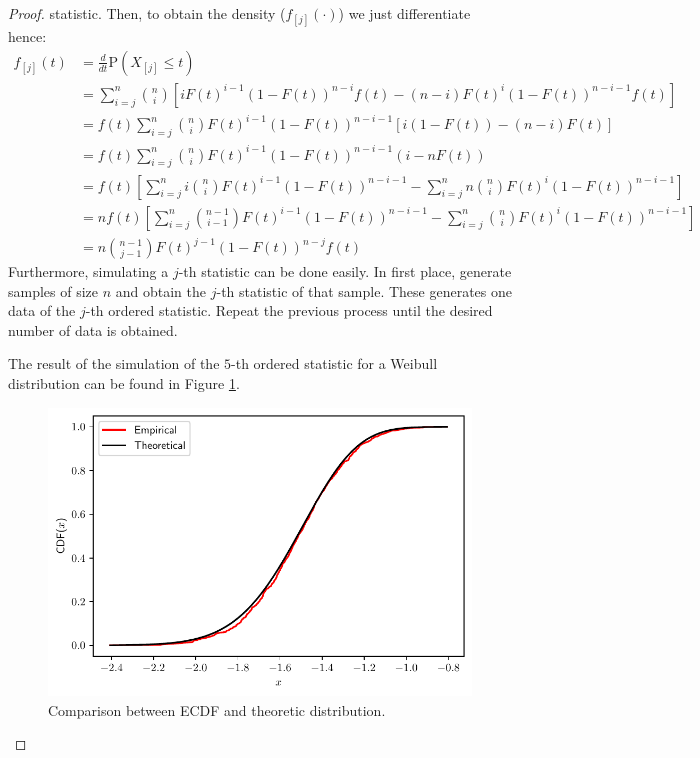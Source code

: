 \documentclass[11pt]{article}
\theoremstyle{definition}
\theoremstyle{remark}
\theoremstyle{remark}
\renewcommand{\P}[1]{\mathrm{P}\left(#1 \right)}
\begin{document}
\begin{proof}
  statistic. Then, to obtain the density ($f_{[j]}(\cdot)$) we just
  differentiate hence:
  \begin{align*}
    f_{[j]}(t) &= \frac{d}{dt} \P{X_{[j]} \le t} \\
               &= \sum_{i=j}^n \binom{n}{i} \left[i F(t)^{i-1}(1 - F(t))^{n-i}f(t) -
                  (n - i) F(t)^i(1 - F(t))^{n-i-1}f(t)\right] \\
               &= f(t)\sum_{i=j}^n \binom{n}{i}F(t)^{i-1}(1-F(t))^{n-i-1}\left[i(1 - F(t))
                 - (n - i)F(t)\right] \\
               &= f(t) \sum_{i=j}^n \binom{n}{i}F(t)^{i-1}(1 - F(t))^{n-i-1}
                 (i - nF(t)) \\
               &= f(t) \left[\sum_{i=j}^n i\binom{n}{i} F(t)^{i-1}(1 - F(t))^{n -i-1} -
                 \sum_{i=j}^n n \binom{n}{i} F(t)^i(1 - F(t))^{n - i - 1}\right] \\
               &= nf(t) \left[\sum_{i=j}^n \binom{n-1}{i-1}F(t)^{i-1}(1 - F(t))^{n -i-1} -
                 \sum_{i=j}^n \binom{n}{i} F(t)^i(1 - F(t))^{n - i - 1}\right] \\
                 &= n\binom{n-1}{j-1}F(t)^{j-1}(1 - F(t))^{n-j}f(t)
  \end{align*}
  Furthermore, simulating a $j$-th statistic can be done easily. In
  first place, generate samples of size $n$ and obtain the $j$-th
  statistic of that sample. These generates one data of the $j$-th
  ordered statistic. Repeat the previous process until the desired
  number of data is obtained.

  The result of the simulation of the $5$-th ordered statistic for a
  Weibull distribution can be found in Figure \ref{fig:ex7}.
  \begin{figure}[H]
    \centering
    \includegraphics[scale=0.5]{../figs/order.pdf}
    \caption{Comparison between ECDF and theoretic distribution.}
    \label{fig:ex7}
  \end{figure}
\end{proof}
\end{document}
